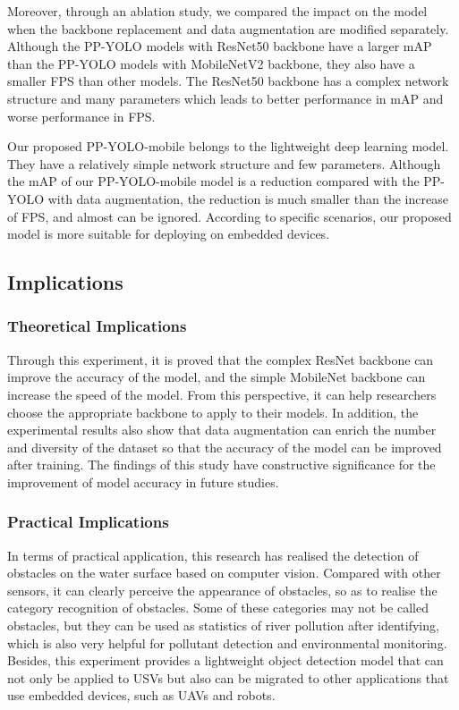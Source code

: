 \documentclass[sensors,article,submit,moreauthors,pdftex]{Definitions/mdpi}
\begin{document}
\begin{paracol}{2}
Moreover, through an ablation study, we compared the impact on the model when the backbone replacement and data augmentation are modified separately.
Although the PP-YOLO models with ResNet50 backbone have a larger mAP than the PP-YOLO models with MobileNetV2 backbone, they also have a smaller FPS than other models. The ResNet50 backbone has a complex network structure and many parameters which leads to better performance in mAP and worse performance in FPS.


Our proposed PP-YOLO-mobile belongs to the lightweight deep learning model. They have a relatively simple network structure and few parameters. Although the mAP of our PP-YOLO-mobile model is a reduction compared with the PP-YOLO with data augmentation, the reduction is much smaller than the increase of FPS, and almost can be ignored. According to specific scenarios, our proposed model is more suitable for deploying on embedded devices.


\subsection{Implications}
\subsubsection{Theoretical Implications}
Through this experiment, it is proved that the complex ResNet backbone can improve the accuracy of the model, and the simple MobileNet backbone can increase the speed of the model. From this perspective, it can help researchers choose the appropriate backbone to apply to their models. In addition, the experimental results also show that data augmentation can enrich the number and diversity of the dataset so that the accuracy of the model can be improved after training. The findings of this study have constructive significance for the improvement of model accuracy in future studies.

\subsubsection{Practical Implications}
In terms of practical application, this research has realised the detection of obstacles on the water surface based on computer vision. Compared with other sensors, it can clearly perceive the appearance of obstacles, so as to realise the category recognition of obstacles.
Some of these categories may not be called obstacles, but they can be used as statistics of river pollution after identifying, which is also very helpful for pollutant detection and environmental monitoring. 
Besides, this experiment provides a lightweight object detection model that can not only be applied to USVs but also can be migrated to other applications that use embedded devices, such as UAVs and robots.



\end{paracol}
\end{document}
